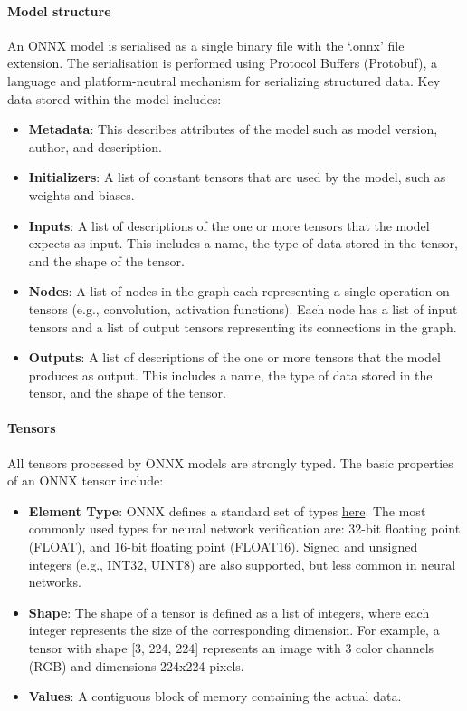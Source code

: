 \paragraph{Model structure} 

An ONNX model is serialised as a single binary file with the `.onnx' file extension. The serialisation is performed using Protocol Buffers (Protobuf), a language and platform-neutral mechanism for serializing structured data. Key data stored within the model includes:
\begin{itemize}
	\item \textbf{Metadata}: This describes attributes of the model such as model version, author, and description.
	\item \textbf{Initializers}: A list of constant tensors that are used by the model, such as weights and biases.
	\item \textbf{Inputs}: A list of descriptions of the one or more tensors that the model expects as input. This includes a name, the type of data stored in the tensor, and the shape of the tensor.
	\item \textbf{Nodes}: A list of nodes in the graph each representing a single operation on  tensors (e.g., convolution, activation functions). Each node has a list of input tensors and a list of output tensors representing its connections in the graph.
	\item \textbf{Outputs}: A list of descriptions of the one or more tensors that the model produces as output. This includes a name, the type of data stored in the tensor, and the shape of the tensor.
\end{itemize}


\paragraph{Tensors}
All tensors processed by ONNX models are strongly typed. The basic properties of an ONNX tensor include:
\begin{itemize}
	\item \textbf{Element Type}: ONNX defines a standard set of types \href{https://onnx.ai/onnx/intro/concepts.html#element-type}{here}. 
	The most commonly used types for neural network verification are: 32-bit floating point (FLOAT), and 16-bit floating point (FLOAT16). Signed and unsigned integers (e.g., INT32, UINT8) are also supported, 
	but less common in neural networks.
	\item \textbf{Shape}: The shape of a tensor is defined as a list of integers, where each integer represents the size of the corresponding dimension. For example, a tensor with shape [3, 224, 224] 
	represents an image with 3 color channels (RGB) and dimensions 224x224 pixels.
	\item \textbf{Values}: A contiguous block of memory containing the actual data.
\end{itemize}

